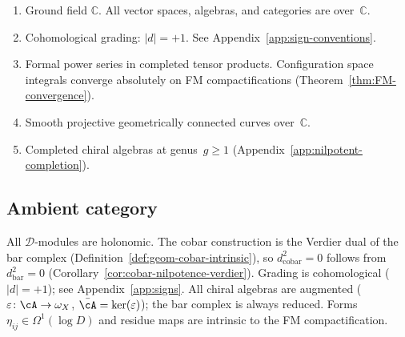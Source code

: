 \begin{convention}
\label{conv:standing-assumptions}
\begin{enumerate}[label=\textup{(SA\arabic*)}]
\item\label{SA:ground-field} Ground field $\mathbb{C}$.  All
  vector spaces, algebras, and categories are
  over~$\mathbb{C}$.
\item\label{SA:grading} Cohomological grading: $|d| = +1$.
  See Appendix~\ref{app:sign-conventions}.
\item\label{SA:convergence} Formal power series in completed
  tensor products.  Configuration space integrals converge
  absolutely on FM compactifications
  (Theorem~\ref{thm:FM-convergence}).
\item\label{SA:curves} Smooth projective geometrically connected
  curves over~$\mathbb{C}$.
\item\label{SA:completion} Completed chiral algebras at
  genus~$g \geq 1$
  (Appendix~\ref{app:nilpotent-completion}).
\end{enumerate}
\end{convention}

\subsection{Ambient category}
\label{subsec:ambient-category}

All $\mathcal{D}$-modules are holonomic.  The cobar
construction is the Verdier dual of the bar complex
(Definition~\ref{def:geom-cobar-intrinsic}), so
$d_{\mathrm{cobar}}^2 = 0$ follows from $d_{\mathrm{bar}}^2 = 0$
(Corollary~\ref{cor:cobar-nilpotence-verdier}).
Grading is cohomological ($|d| = +1$); see
Appendix~\ref{app:signs}.
All chiral algebras are augmented
($\varepsilon\colon \cA \to \omega_X$,
$\bar{\cA} = \ker(\varepsilon)$);
the bar complex is always reduced.
Forms $\eta_{ij} \in \Omega^1(\log D)$ and residue maps are
intrinsic to the FM compactification.
